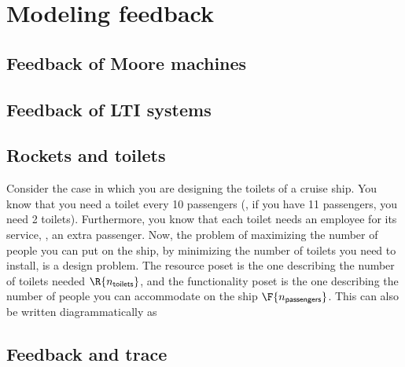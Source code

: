 
\section{Modeling feedback}
\label{sec:modeling-feedback}


\subsection{Feedback of Moore machines}


\subsection{Feedback of LTI systems}


\subsection{Rockets and toilets}

Consider the case in which you are designing the toilets of a cruise ship.
You know that you need a toilet every 10 passengers (\ie, if you have 11 passengers, you need 2 toilets).
Furthermore, you know that each toilet needs an employee for its service, \ie, an extra passenger.
Now, the problem of maximizing the number of people you can put on the ship, by minimizing the number of toilets you need to install, is a design problem.
The resource poset is the one describing the number of toilets needed $\R{n_\mathsf{toilets}}$, and the functionality poset is the one describing the number of people you can accommodate on the ship $\F{n_\mathsf{passengers}}$.
This can also be written diagrammatically as


\subsection{Feedback and trace}


